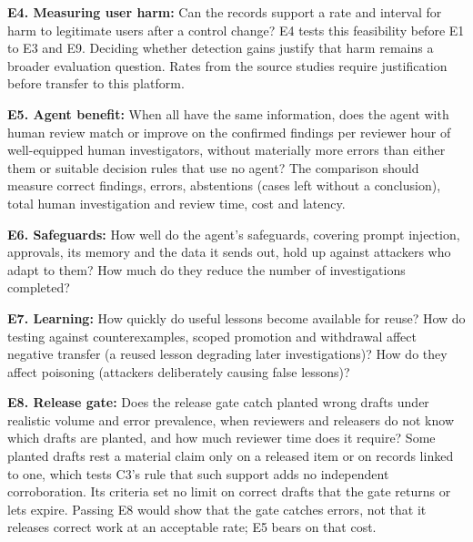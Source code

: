 \documentclass[
  11pt,
]{article}
\begin{document}
\textbf{E4. Measuring user harm:} Can the records support a rate and
interval for harm to legitimate users after a control change? E4 tests
this feasibility before E1 to E3 and E9. Deciding whether detection
gains justify that harm remains a broader evaluation question. Rates
from the source studies require justification before transfer to this
platform.

\textbf{E5. Agent benefit:} When all have the same information, does the
agent with human review match or improve on the confirmed findings per
reviewer hour of well-equipped human investigators, without materially
more errors than either them or suitable decision rules that use no
agent? The comparison should measure correct findings, errors,
abstentions (cases left without a conclusion), total human investigation
and review time, cost and latency.

\textbf{E6. Safeguards:} How well do the agent's safeguards, covering
prompt injection, approvals, its memory and the data it sends out, hold
up against attackers who adapt to them? How much do they reduce the
number of investigations completed?

\textbf{E7. Learning:} How quickly do useful lessons become available
for reuse? How do testing against counterexamples, scoped promotion and
withdrawal affect negative transfer (a reused lesson degrading later
investigations)? How do they affect poisoning (attackers deliberately
causing false lessons)?

\textbf{E8. Release gate:} Does the release gate catch planted wrong
drafts under realistic volume and error prevalence, when reviewers and
releasers do not know which drafts are planted, and how much reviewer
time does it require? Some planted drafts rest a material claim only on
a released item or on records linked to one, which tests C3's rule that
such support adds no independent corroboration. Its criteria set no
limit on correct drafts that the gate returns or lets expire. Passing E8
would show that the gate catches errors, not that it releases correct
work at an acceptable rate; E5 bears on that cost.
\end{document}

